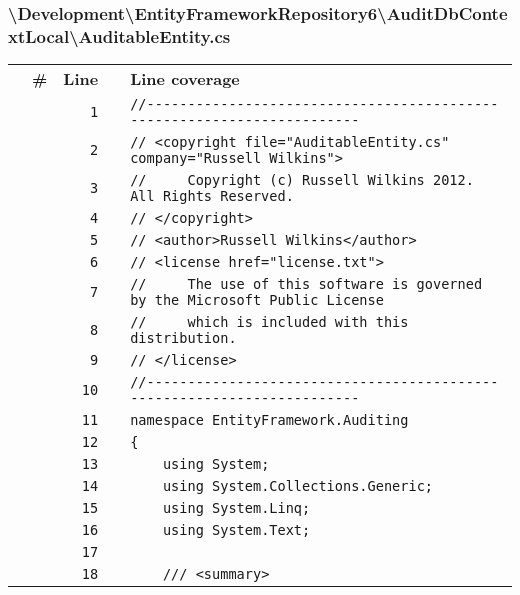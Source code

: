 \documentclass[a4paper,10pt]{article}
\begin{document}
\subsubsection{\textbackslash Development\textbackslash EntityFrameworkRepository6\textbackslash AuditDbContextLocal\textbackslash AuditableEntity.cs}
\begin{longtable}[l]{lrrll}
\textbf{} & \textbf{\#} & \textbf{Line} & \textbf{} & \textbf{Line coverage}\\
\cellcolor{gray} &  & \verb~1~ & & \verb~//-----------------------------------------------------------------------~\\
\cellcolor{gray} &  & \verb~2~ & & \verb~// <copyright file="AuditableEntity.cs" company="Russell Wilkins">~\\
\cellcolor{gray} &  & \verb~3~ & & \verb~//     Copyright (c) Russell Wilkins 2012. All Rights Reserved.~\\
\cellcolor{gray} &  & \verb~4~ & & \verb~// </copyright>~\\
\cellcolor{gray} &  & \verb~5~ & & \verb~// <author>Russell Wilkins</author>~\\
\cellcolor{gray} &  & \verb~6~ & & \verb~// <license href="license.txt">~\\
\cellcolor{gray} &  & \verb~7~ & & \verb~//     The use of this software is governed by the Microsoft Public License~\\
\cellcolor{gray} &  & \verb~8~ & & \verb~//     which is included with this distribution.~\\
\cellcolor{gray} &  & \verb~9~ & & \verb~// </license>~\\
\cellcolor{gray} &  & \verb~10~ & & \verb~//-----------------------------------------------------------------------~\\
\cellcolor{gray} &  & \verb~11~ & & \verb~namespace EntityFramework.Auditing~\\
\cellcolor{gray} &  & \verb~12~ & & \verb~{~\\
\cellcolor{gray} &  & \verb~13~ & & \verb~    using System;~\\
\cellcolor{gray} &  & \verb~14~ & & \verb~    using System.Collections.Generic;~\\
\cellcolor{gray} &  & \verb~15~ & & \verb~    using System.Linq;~\\
\cellcolor{gray} &  & \verb~16~ & & \verb~    using System.Text;~\\
\cellcolor{gray} &  & \verb~17~ & & \verb~~\\
\cellcolor{gray} &  & \verb~18~ & & \verb~    /// <summary>~\\

\end{longtable}
\end{document}
